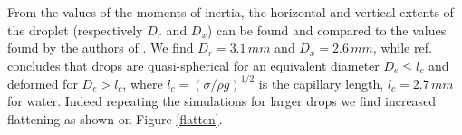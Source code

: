 From the values of the moments of inertia, the horizontal and vertical 
extents of the droplet (respectively $D_r$ and $D_x$) can be found 
and compared to the values found by the authors of \cite{Reyssat:2007ko}. 
We find $D_r=3.1 \,mm$ and $D_x=2.6 \,mm$, while ref. \cite{Reyssat:2007ko} 
concludes that drops are quasi-spherical for an equivalent diameter 
$D_e \le l_c$ and deformed for $D_e > l_c$, where $l_c =(\sigma/\rho g)^{1/2}$ 
is the capillary length, $l_c = 2.7 \,mm$ for water. 
Indeed repeating the simulations for larger drops we find increased 
flattening as shown on Figure \ref{flatten}. 
%

